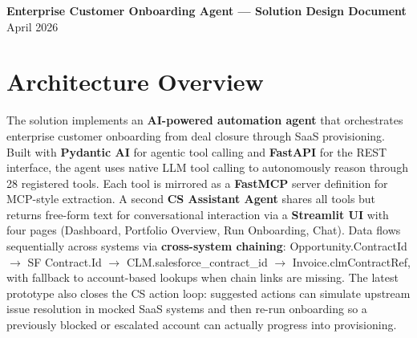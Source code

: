 \documentclass[8pt,a4paper]{article}
\begin{document}
\begin{center}
{\large\bfseries\color{primary} Enterprise Customer Onboarding Agent --- Solution Design Document}\\[0.03em]
{\small April 2026}
\end{center}

\section{Architecture Overview}

The solution implements an \textbf{AI-powered automation agent} that orchestrates enterprise customer onboarding from deal closure through SaaS provisioning. Built with \textbf{Pydantic AI} for agentic tool calling and \textbf{FastAPI} for the REST interface, the agent uses native LLM tool calling to autonomously reason through 28 registered tools. Each tool is mirrored as a \textbf{FastMCP} server definition for MCP-style extraction. A second \textbf{CS Assistant Agent} shares all tools but returns free-form text for conversational interaction via a \textbf{Streamlit UI} with four pages (Dashboard, Portfolio Overview, Run Onboarding, Chat). Data flows sequentially across systems via \textbf{cross-system chaining}: Opportunity.ContractId $\rightarrow$ SF Contract.Id $\rightarrow$ CLM.salesforce\_contract\_id $\rightarrow$ Invoice.clmContractRef, with fallback to account-based lookups when chain links are missing. The latest prototype also closes the CS action loop: suggested actions can simulate upstream issue resolution in mocked SaaS systems and then re-run onboarding so a previously blocked or escalated account can actually progress into provisioning.

\vspace{0.1em}
\end{document}

